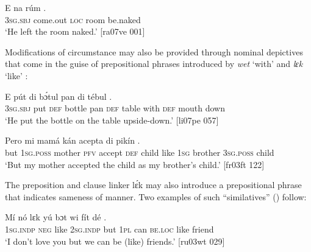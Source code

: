 \ea%
    \label{ex:key:884}
    \gll E        na  rúm    .\\
\textsc{3sg.sbj}  come.out  \textsc{loc}  room  be.naked\\

\glt ‘He left the room naked.’ [ra07ve 001]
\z

Modifications of circumstance \is{}may also be provided through nominal depictives that come in the guise of prepositional phrases introduced by \textit{wet} ‘with’  and \textit{lɛk} ‘like’ :


\ea%
    \label{ex:key:885}
    \gll E    pút  di  bɔ́tul  pan  di  tébul            .\\
\textsc{3sg.sbj}  put  \textsc{def}  bottle  pan  \textsc{def}  table  with    \textsc{def}  mouth  down\\

\glt ‘He put the bottle on the table upside-down.’ [li07pe 057]
\z


\ea%
    \label{ex:key:886}
    \gll Pero    mi    mamá  kán  acepta  di  pikín    
      .\\
but    \textsc{1sg.poss}  mother  \textsc{pfv}  accept  \textsc{def}  child  like  \textsc{1sg}
brother  \textsc{3sg.poss}  child\\

\glt ‘But my mother accepted the child as my brother’s child.’ [fr03ft 122]
\z

The preposition and clause linker lɛ́k may also introduce a prepositional phrase that indicates sameness of manner. Two examples of such “similatives” (\citealt{HaspelmathBuchholz1998}) follow: 


\ea%
    \label{ex:key:887}
    \gll Mí    nó  lɛk  yú    bɔt  wi  fít  dé      .\\
\textsc{1sg.indp}  \textsc{neg}  like  \textsc{2sg.indp}  but  \textsc{1pl}  can  \textsc{be.loc}  like  friend\\

\glt ‘I don’t love you but we can be (like) friends.’ [ru03wt 029]
\z

